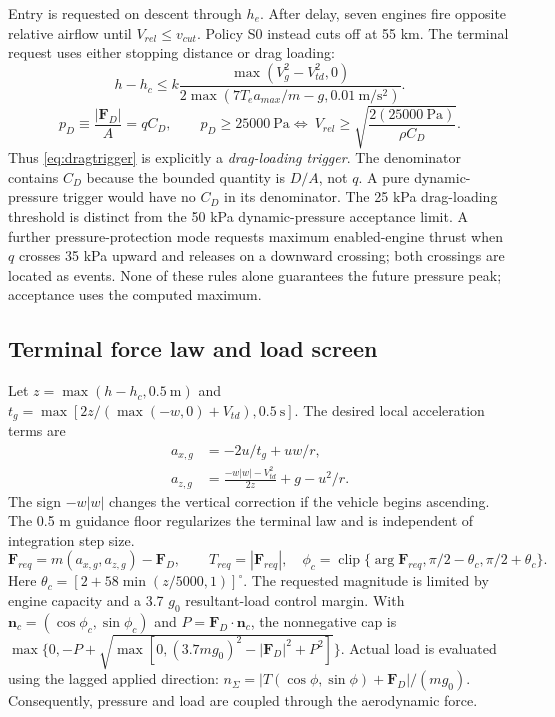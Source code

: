 \documentclass[11pt,a4paper]{article}
\newcommand{\vct}[1]{\bm{#1}}
\begin{document}
Entry is requested on descent through $h_e$. After delay, seven engines fire opposite relative airflow until $V_{rel}\le v_{cut}$. Policy S0 instead cuts off at 55 km. The terminal request uses either stopping distance or drag loading:
\begin{equation}
 h-h_c\le k\frac{\max(V_g^2-V_{td}^2,0)}{2\max(7T_ea_{max}/m-g,0.01\ \mathrm{m/s^2})}.
\label{eq:stopping}\end{equation}
\begin{equation}
p_D\equiv\frac{|\vct F_D|}{A}=qC_D,\qquad
p_D\ge25000\ \mathrm{Pa} \Longleftrightarrow\
V_{rel}\ge\sqrt{\frac{2(25000\ \mathrm{Pa})}{\rho C_D}}.
\label{eq:dragtrigger}\end{equation}
Thus \cref{eq:dragtrigger} is explicitly a \emph{drag-loading trigger}. The denominator contains $C_D$ because the bounded quantity is $D/A$, not $q$. A pure dynamic-pressure trigger would have no $C_D$ in its denominator. The 25 kPa drag-loading threshold is distinct from the 50 kPa dynamic-pressure acceptance limit. A further pressure-protection mode requests maximum enabled-engine thrust when $q$ crosses 35 kPa upward and releases on a downward crossing; both crossings are located as events. None of these rules alone guarantees the future pressure peak; acceptance uses the computed maximum.

\subsection{Terminal force law and load screen}
Let $z=\max(h-h_c,0.5\ \mathrm{m})$ and $t_g=\max[2z/(\max(-w,0)+V_{td}),0.5\ \mathrm{s}]$. The desired local acceleration terms are
\begin{equation}\begin{aligned}
a_{x,g}&=-2u/t_g+uw/r,\\
a_{z,g}&=\frac{-w|w|-V_{td}^2}{2z}+g-u^2/r.
\end{aligned}\label{eq:guidance}\end{equation}
The sign $-w|w|$ changes the vertical correction if the vehicle begins ascending. The 0.5 m guidance floor regularizes the terminal law and is independent of integration step size.
\begin{equation}
\vct F_{req}=m(a_{x,g},a_{z,g})-\vct F_D,\qquad
T_{req}=|\vct F_{req}|,\quad
\phi_c=\operatorname{clip}\{\arg\vct F_{req},\pi/2-\theta_c,\pi/2+\theta_c\}.
\label{eq:force}\end{equation}
Here $\theta_c=[2+58\min(z/5000,1)]^\circ$. The requested magnitude is limited by engine capacity and a 3.7 $g_0$ resultant-load control margin. With $\vct n_c=(\cos\phi_c,\sin\phi_c)$ and $P=\vct F_D\cdot\vct n_c$, the nonnegative cap is $\max\{0,-P+\sqrt{\max[0,(3.7mg_0)^2-|\vct F_D|^2+P^2]}\}$. Actual load is evaluated using the lagged applied direction: $n_\Sigma=|T(\cos\phi,\sin\phi)+\vct F_D|/(mg_0)$. Consequently, pressure and load are coupled through the aerodynamic force.
\end{document}
